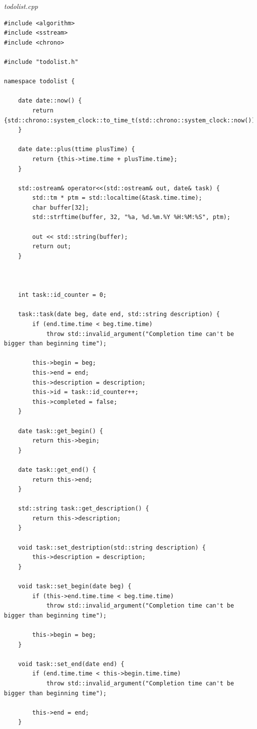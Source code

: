 \documentclass[a4paper,14pt]{extarticle}
\begin{document}
\textit{todolist.cpp}
\begin{verbatim}
#include <algorithm>
#include <sstream>
#include <chrono>

#include "todolist.h"

namespace todolist {

    date date::now() {
        return {std::chrono::system_clock::to_time_t(std::chrono::system_clock::now())};
    }

    date date::plus(ttime plusTime) {
        return {this->time.time + plusTime.time};
    }

    std::ostream& operator<<(std::ostream& out, date& task) {
        std::tm * ptm = std::localtime(&task.time.time);
        char buffer[32];
        std::strftime(buffer, 32, "%a, %d.%m.%Y %H:%M:%S", ptm);

        out << std::string(buffer);
        return out;
    }



    int task::id_counter = 0;

    task::task(date beg, date end, std::string description) {
        if (end.time.time < beg.time.time) 
            throw std::invalid_argument("Completion time can't be bigger than beginning time");
        
        this->begin = beg;
        this->end = end;
        this->description = description;
        this->id = task::id_counter++;
        this->completed = false;
    }

    date task::get_begin() {
        return this->begin;
    }

    date task::get_end() {
        return this->end;
    }

    std::string task::get_description() {
        return this->description;
    }

    void task::set_destription(std::string description) {
        this->description = description;
    }

    void task::set_begin(date beg) {
        if (this->end.time.time < beg.time.time) 
            throw std::invalid_argument("Completion time can't be bigger than beginning time");

        this->begin = beg;
    }
    
    void task::set_end(date end) {
        if (end.time.time < this->begin.time.time) 
            throw std::invalid_argument("Completion time can't be bigger than beginning time");

        this->end = end;
    }


\end{verbatim}
\end{document}
